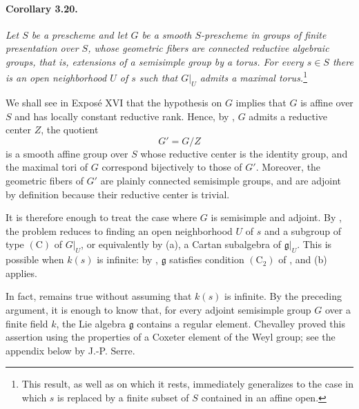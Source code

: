 
\paragraph{\textbf{Corollary 3.20.}}
{\itshape Let \(S\) be a prescheme and let \(G\) be a smooth
\(S\)-prescheme in groups of finite presentation over \(S\), whose
geometric fibers are connected reductive algebraic groups, that is,
extensions of a semisimple group by a torus. For every \(s\in S\)
there is an open neighborhood \(U\) of \(s\) such that
\(G|_U\) admits a maximal torus.}\footnote{This result, as well as
 on which it rests, immediately generalizes to the case in
which \(s\) is replaced by a finite subset of \(S\) contained in
an affine open.}

We shall see in Exposé XVI that the hypothesis on \(G\) implies
that \(G\) is affine over \(S\) and has locally constant reductive
rank. Hence, by \textup{}, \(G\) admits a reductive center
\(Z\), the quotient
\[
  G'=G/Z
\]
is a smooth affine group over \(S\) whose reductive center is the
identity group, and the maximal tori of \(G\) correspond
bijectively to those of \(G'\). Moreover, the geometric fibers of
\(G'\) are plainly connected semisimple groups, and are adjoint by
definition because their reductive center is trivial.

It is therefore enough to treat the case where \(G\) is
semisimple and adjoint. By , the problem reduces to finding an
open neighborhood \(U\) of \(s\) and a subgroup of type
\((\mathrm C)\) of \(G|_U\), or equivalently by \textup{(a)}, a
Cartan subalgebra of \(\mathfrak g|_U\). This is possible when
\(k(s)\) is infinite: by , \(\mathfrak g\) satisfies condition
\((\mathrm C_2)\) of , and \textup{(b)} applies.

In fact,  remains true without assuming that \(k(s)\) is
infinite. By the preceding argument, it is enough to know that, for
every adjoint semisimple group \(G\) over a finite field \(k\), the
Lie algebra \(\mathfrak g\) contains a regular element. Chevalley
proved this assertion using the properties of a Coxeter element of
the Weyl group; see the appendix below by J.-P. Serre.

